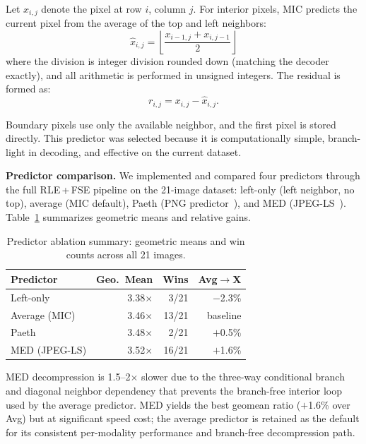 \documentclass[journal]{IEEEtran}
\begin{document}
Let $x_{i,j}$ denote the pixel at row $i$, column $j$. For interior pixels, MIC
predicts the current pixel from the average of the top and left neighbors:
\begin{equation}
  \hat{x}_{i,j} = \left\lfloor \frac{x_{i-1,j} + x_{i,j-1}}{2} \right\rfloor
\end{equation}
where the division is integer division rounded down (matching the decoder
exactly), and all arithmetic is performed in unsigned integers.
The residual is formed as:
\begin{equation}
  r_{i,j} = x_{i,j} - \hat{x}_{i,j}.
\end{equation}

Boundary pixels use only the available neighbor, and the first pixel is stored
directly. This predictor was selected because it is computationally simple,
branch-light in decoding, and effective on the current dataset.

\textbf{Predictor comparison.} We implemented and compared four predictors
through the full RLE\,+\,FSE pipeline on the 21-image dataset: left-only (left
neighbor, no top), average (MIC default), Paeth (PNG predictor~\cite{png}), and
MED (JPEG-LS~\cite{loco1}). Table~\ref{tab:predictor-summary} summarizes
geometric means and relative gains.

\begin{table}[htbp]
\centering
\caption{Predictor ablation summary: geometric means and win counts across all
21 images.}
\label{tab:predictor-summary}
\begin{tabular}{lrrr}
\toprule
Predictor & Geo.\ Mean & Wins & Avg$\to$X \\
\midrule
Left-only & 3.38$\times$ & 3/21 & $-$2.3\% \\
Average (MIC) & 3.46$\times$ & 13/21 & baseline \\
Paeth & 3.48$\times$ & 2/21 & $+$0.5\% \\
MED (JPEG-LS) & 3.52$\times$ & 16/21 & $+$1.6\% \\
\bottomrule
\end{tabular}
\end{table}

MED decompression is 1.5--2$\times$ slower due to the three-way conditional
branch and diagonal neighbor dependency that prevents the branch-free interior
loop used by the average predictor. MED yields the best geomean ratio
($+$1.6\% over Avg) but at significant speed cost; the average predictor is
retained as the default for its consistent per-modality performance and
branch-free decompression path.
\end{document}
